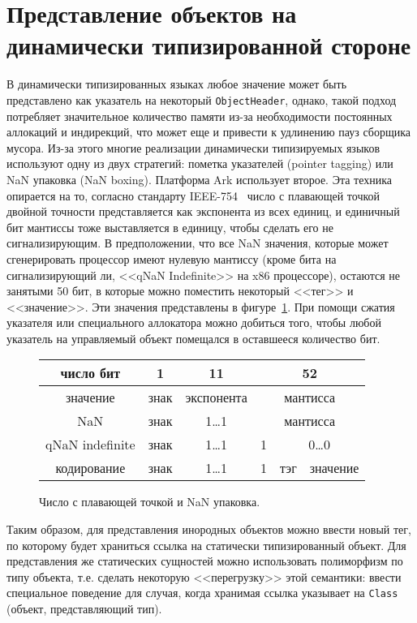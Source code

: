 \documentclass[times
,titlepage
]{itmo-student-thesis}
\begin{document}
\section{Представление объектов на динамически типизированной стороне}\label{nan-boxing-explanation}
В динамически типизированных языках любое значение может быть представлено как указатель на некоторый \texttt{ObjectHeader}, однако, такой подход потребляет значительное количество памяти из-за необходимости постоянных аллокаций и индирекций, что может еще и привести к удлинению пауз сборщика мусора. Из-за этого многие реализации динамически типизируемых языков~\cite{luajit-nan-box,v8-pointer-tagging} используют одну из двух стратегий: пометка указателей (pointer tagging) или NaN упаковка (NaN boxing). Платформа Ark использует второе. Эта техника опирается на то, согласно стандарту IEEE-754~\cite{cowlishaw2008standard} число с плавающей точкой двойной точности представляется как экспонента из всех единиц, и единичный бит мантиссы тоже выставляется в единицу, чтобы сделать его не сигнализирующим. В предположении, что все NaN значения, которые может сгенерировать процессор имеют нулевую мантиссу (кроме бита на сигнализирующий ли, <<qNaN Indefinite>> на x86 процессоре), остаются не занятыми 50 бит, в которые можно поместить некоторый <<тег>> и <<значение>>. Эти значения представлены в фигуре~\ref{fig:nan-explain}. При помощи сжатия указателя или специального аллокатора можно добиться того, чтобы любой указатель на управляемый объект помещался в оставшееся количество бит.\par
\begin{figure}[!h]
	\caption{Число с плавающей точкой и NaN упаковка.}\label{fig:nan-explain}
	\centering
	\begin{tabular}{|c|c|c|c|c|c|}
		\hline
		число бит & 1 & 11 & \multicolumn{3}{c|}{52} \\
		\hline
		значение & знак & экспонента & \multicolumn{3}{c|}{мантисса} \\
		\hline
		NaN & знак & 1\dots 1 & \multicolumn{3}{c|}{мантисса} \\
		\hline
		qNaN indefinite & знак & 1\dots 1 & 1 & \multicolumn{2}{c|}{0\dots0} \\
		\hline
		кодирование & знак & 1\dots 1 & 1 & тэг & значение \\
		\hline
	\end{tabular}
\end{figure}
Таким образом, для представления инородных объектов можно ввести новый тег, по которому будет храниться ссылка на статически типизированный объект. Для представления же статических сущностей можно использовать полиморфизм по типу объекта, т.е. сделать некоторую <<перегрузку>> этой семантики: ввести специальное поведение для случая, когда хранимая ссылка указывает на \texttt{Class} (объект, представляющий тип).
\end{document}
